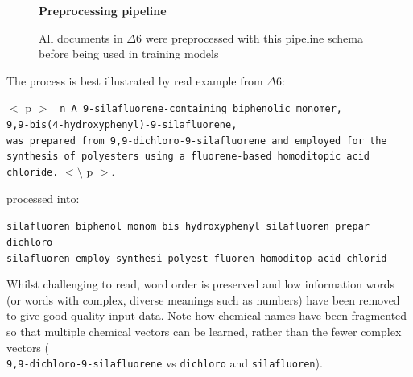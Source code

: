 \begin{figure}[H]
    \centering
    \textbf{Preprocessing pipeline}\par\medskip
    \caption[Preprocessing Pipeline]{All documents in $\Delta6$ were preprocessed with this pipeline schema before being used in training models}
     \label{fig:SANPIPE}
\end{figure}
The process is best illustrated by real example from $\Delta6$:

$<$ p $>$
\texttt{ n A 9-silafluorene-containing biphenolic monomer,\\ 9,9-bis(4-hydroxyphenyl)-9-silafluorene,\\ was prepared from 9,9-dichloro-9-silafluorene and employed for the \\synthesis of polyesters using a fluorene-based homoditopic acid chloride.} $< \setminus$ p $>$.
\cite{sanex} 

processed into:

\texttt{silafluoren biphenol monom bis hydroxyphenyl silafluoren prepar dichloro\\ silafluoren employ synthesi polyest fluoren homoditop acid chlorid}

Whilst challenging to read, word order is preserved and low information words (or words with complex, diverse meanings such as numbers) have been removed to give good-quality input data. Note how chemical names have been fragmented so that multiple chemical vectors can be learned, rather than the fewer complex vectors (\texttt{\\9,9-dichloro-9-silafluorene} vs \texttt{dichloro} and \texttt{silafluoren}).

